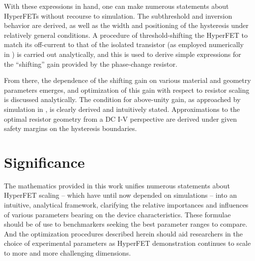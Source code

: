 \begin{multicols}{2}
With these expressions in hand, one can make numerous statements about HyperFETs without recourse to simulation.  The subthreshold and inversion behavior are derived, as well as the width and positioning of the hysteresis under relatively general conditions.  A procedure of threshold-shifting the HyperFET to match its off-current to that of the isolated transistor (as employed numerically in \cite{Shukla_2015, Frougier_2016}) is carried out analytically, and this is used to derive simple expressions for the ``shifting'' gain provided by the phase-change resistor. 

From there, the dependence of the shifting gain on various material and geometry parameters emerges, and optimization of this gain with respect to resistor scaling is discussed analytically.  The condition for above-unity gain, as approached by simulation in \cite{Frougier_2016}, is clearly derived and intuitively stated.  Approximations to the optimal resistor geometry from a DC I-V perspective are derived under given safety margins on the hysteresis boundaries.

\section*{Significance}
The mathematics provided in this work unifies numerous statements about HyperFET scaling -- which have until now depended on simulations -- into an intuitive, analytical framework, clarifying the relative importances and influences of various parameters bearing on the device characteristics.  These formulae should be of use to benchmarkers seeking the best parameter ranges to compare. And the optimization procedures described herein should aid researchers in the choice of experimental parameters as HyperFET demonstration continues to scale to more and more challenging dimensions.


\ifdoublecol\end{multicols}\fi

\vfill

